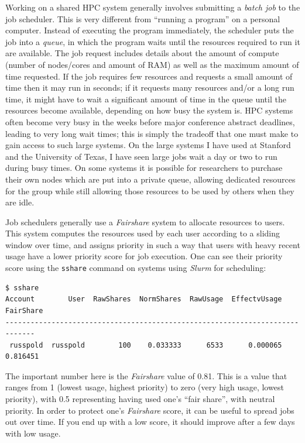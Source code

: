 Working on a shared HPC system generally involves submitting a \textit{batch job} to the job scheduler.  This is very different from ``running a program'' on a personal computer. Instead of executing the program immediately, the scheduler puts the job into a \textit{queue}, in which the program waits until the resources required to run it are available. The job request includes details about the amount of compute (number of nodes/cores and amount of RAM) as well as the maximum amount of time requested. If the job requires few resources and requests a small amount of time then it may run in seconds; if it requests many resources and/or a long run time, it might have to wait a significant amount of time in the queue until the resources become available, depending on how busy the system is.  HPC systems often become very busy in the weeks before major conference abstract deadlines, leading to very long wait times; this is simply the tradeoff that one must make to gain access to such large systems.  On the large systems I have used at Stanford and the University of Texas, I have seen large jobs wait a day or two to run during busy times.  On some systems it is possible for researchers to purchase their own nodes which are put into a private queue, allowing dedicated resources for the group while still allowing those resources to be used by others when they are idle.

Job schedulers generally use a \textit{Fairshare} system to allocate resources to users. This system computes the resources used by each user according to a sliding window over time, and assigns priority in such a way that users with heavy recent usage have a lower priority score for job execution.  One can see their priority score using the \texttt{sshare} command on systems using \textit{Slurm} for scheduling:

\begin{lstlisting}[style=shellshort]
$ sshare
Account        User  RawShares  NormShares  RawUsage  EffectvUsage  FairShare
----------------------------------------------------------------------------- 
 russpold  russpold        100    0.033333      6533      0.000065   0.816451
\end{lstlisting}

The important number here is the \textit{Fairshare} value of 0.81. This is a value that ranges from 1 (lowest usage, highest priority) to zero (very high usage, lowest priority), with 0.5 representing having used one's ``fair share'', with neutral priority.  In order to protect one's \textit{Fairshare} score, it can be useful to spread jobs out over time.  If you end up with a low score, it should improve after a few days with low usage.

